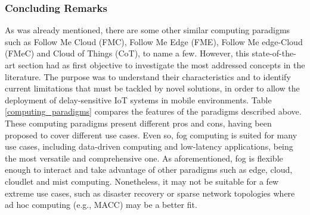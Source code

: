 \subsubsection{Concluding Remarks}
\noindent As was already mentioned, there are some other similar computing paradigms such as Follow Me Cloud (FMC), Follow Me Edge (FME), Follow Me edge-Cloud (FMeC) and Cloud of Things (CoT), to name a few. However, this state-of-the-art section had as first objective to investigate the most addressed concepts in the literature. The purpose was to understand their characteristics and to identify current limitations that must be tackled by novel solutions, in order to allow the deployment of delay-sensitive IoT systems in mobile environments. Table \ref{computing_paradigms} compares the features of the paradigms described above.\\
\noindent\tab These computing paradigms present different pros and cons, having been proposed to cover different use cases. Even so, fog computing is suited for many use cases, including data-driven computing and low-latency applications, being the most versatile and comprehensive one. As aforementioned, fog is flexible enough to interact and take advantage of other paradigms such as edge, cloud, cloudlet and mist computing. Nonetheless, it may not be suitable for a few extreme use cases, such as disaster recovery or sparse network topologies where ad hoc computing (e.g., MACC) may be a better fit.
